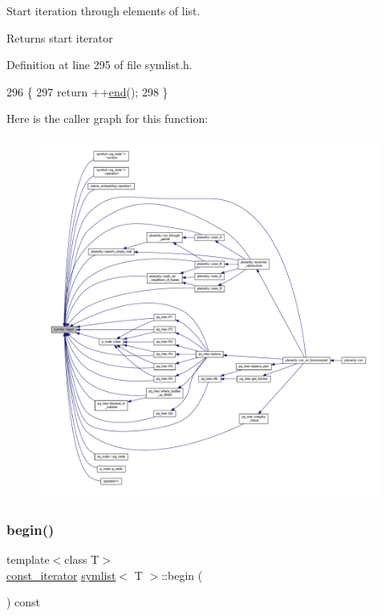 Start iteration through elements of list. 

\begin{DoxyReturn}{Returns}
start iterator 
\end{DoxyReturn}


Definition at line 295 of file symlist.\+h.


\begin{DoxyCode}
296     \{
297     \textcolor{keywordflow}{return} ++\mbox{\hyperlink{classsymlist_a7283589fa01f79d722f8256d7a6a7883}{end}}();
298     \}
\end{DoxyCode}
Here is the caller graph for this function\+:\nopagebreak
\begin{figure}[H]
\begin{center}
\leavevmode
\includegraphics[width=350pt]{classsymlist_a525b8d44af5d771fe15916372515cce0_icgraph}
\end{center}
\end{figure}
\mbox{\label{classsymlist_a843d2df09f34079f6547f338b50823cd}} 
\subsubsection{\texorpdfstring{begin()}{begin()}\hspace{0.1cm}{\footnotesize\ttfamily [2/2]}}
{\footnotesize\ttfamily template$<$class T$>$ \\
\mbox{\hyperlink{classsymlist_af15c0ca931299054f83d17a1580a5159}{const\+\_\+iterator}} \mbox{\hyperlink{classsymlist}{symlist}}$<$ T $>$\+::begin (\begin{DoxyParamCaption}{ }\end{DoxyParamCaption}) const\hspace{0.3cm}{\ttfamily [inline]}}



